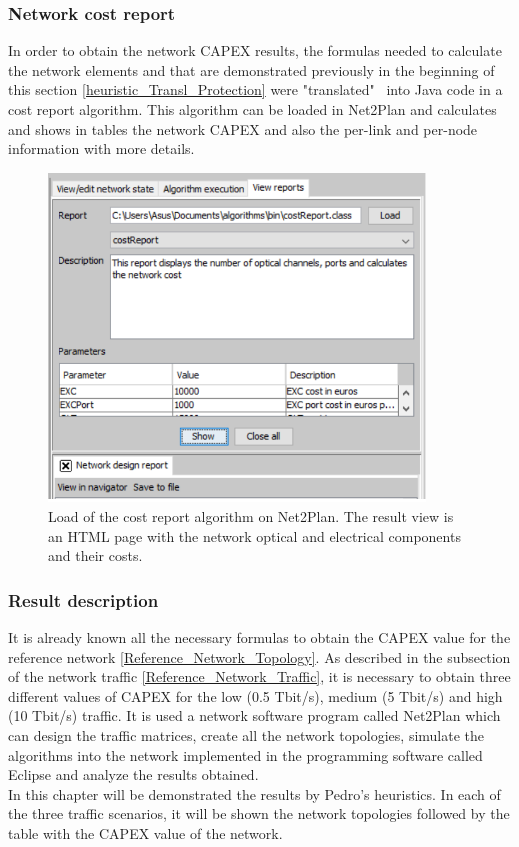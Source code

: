 \subsubsection{Network cost report}

\vspace{11pt}
In order to obtain the network CAPEX results, the formulas needed to calculate the network elements and that are demonstrated previously in the beginning of this section \ref{heuristic_Transl_Protection} were "translated" \ into Java code in a cost report algorithm. This algorithm can be loaded in Net2Plan and calculates and shows in tables the network CAPEX and also the per-link and per-node information with more details.

\begin{figure}[H]
\centering
\includegraphics[width=10cm]{sdf/heuristic/translucent_protection/figures/cost_report_translucent}
\caption{Load of the cost report algorithm on Net2Plan. The result view is an HTML page with the network optical and electrical components and their costs.}
\label{cost_report_translucent_protec}
\end{figure}

\newpage
\subsubsection{Result description}\label{result_description_translucent_heuristic_protec}

It is already known all the necessary formulas to obtain the CAPEX value for the reference network \ref{Reference_Network_Topology}. As described in the subsection of the network traffic \ref{Reference_Network_Traffic}, it is necessary to obtain three different values of CAPEX for the low (0.5 Tbit/s), medium (5 Tbit/s) and high (10 Tbit/s) traffic. It is used a network software program called Net2Plan which can design the traffic matrices, create all the network topologies, simulate the algorithms into the network implemented in the programming software called Eclipse and analyze the results obtained.\\
In this chapter will be demonstrated the results by Pedro's heuristics. In each of the three traffic scenarios, it will be shown the network topologies followed by the table with the CAPEX value of the network.\\

